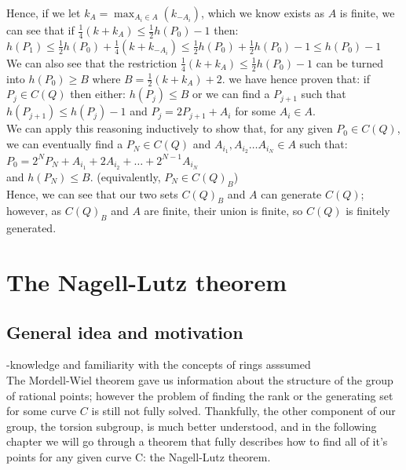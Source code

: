 \documentclass{article}
\begin{document}
Hence, if we let $k_A = \max_{A_i \in A}(k_{-A_i})$, which we know exists as $A$ is finite, we can see that if $\frac{1}{4}(k + k_A) \leq \frac{1}{2}h(P_0) - 1$ then:\\

$h(P_1) \leq \frac{1}{2}h(P_0) + \frac{1}{4} (k + k_{-A_i}) \leq \frac{1}{2}h(P_0) + \frac{1}{2}h(P_0) - 1 \leq h(P_0) - 1$\\

We can also see that the restriction $\frac{1}{4}(k + k_A) \leq \frac{1}{2}h(P_0) - 1$ can be turned into $h(P_0) \geq B$ where $B = \frac{1}{2}(k + k_A) + 2$. we have hence proven that: if $P_j \in C(Q)$ then either: $h(P_j) \leq B$ or we can find a $P_{j + 1}$ such that $h(P_{j + 1}) \leq h(P_j) - 1$ and $P_j = 2P_{j+1} + A_i$ for some $A_i \in A$.\\

We can apply this reasoning inductively to show that, for any given $P_0 \in C(Q)$, we can eventually find a $P_N \in C(Q)$ and $A_{i_1}, A_{i_2} \dots A_{i_N} \in A$ such that:\\

$P_0 = 2^N P_N + A_{i_1} + 2 A_{i_2} + \dots + 2^{N-1}A_{i_N}$\\

and $h(P_N) \leq B$. (equivalently, $P_N \in C(Q)_B$)\\

Hence, we can see that our two sets $C(Q)_B$ and $A$ can generate $C(Q)$; however, as $C(Q)_B$ and $A$ are finite, their union is finite, so $C(Q)$ is finitely generated.

\newpage

\section{The Nagell-Lutz theorem}

\subsection{General idea and motivation}

-knowledge and familiarity with the concepts of rings asssumed\\

The Mordell-Wiel theorem gave us information about the structure of the group of rational points; however the problem of finding the rank or the generating set for some curve $C$ is still not fully solved. Thankfully, the other component of our group, the torsion subgroup, is much better understood, and in the following chapter we will go through a theorem that fully describes how to find all of it's points for any given curve C: the Nagell-Lutz theorem.\\
\end{document}
